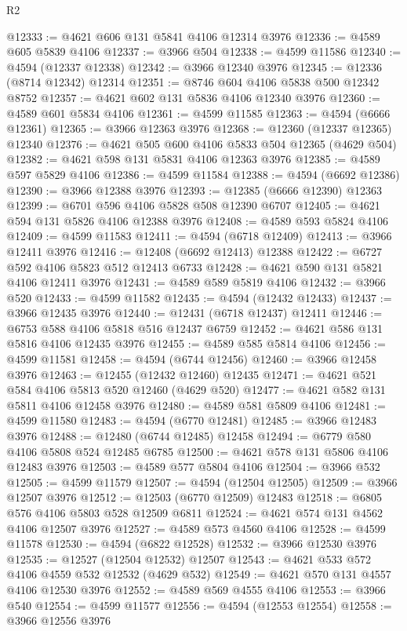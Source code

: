 \begin{lexlean}{R2}
\begin{coremodule}
@12333 := @4621 @606 @131 @5841 @4106 @12314 @3976
@12336 := @4589 @605 @5839 @4106
@12337 := @3966 @504
@12338 := @4599 @11586
@12340 := @4594 (@12337 @12338)
@12342 := @3966 @12340 @3976
@12345 := @12336 (@8714 @12342) @12314
@12351 := @8746 @604 @4106 @5838 @500 @12342 @8752
@12357 := @4621 @602 @131 @5836 @4106 @12340 @3976
@12360 := @4589 @601 @5834 @4106
@12361 := @4599 @11585
@12363 := @4594 (@6666 @12361)
@12365 := @3966 @12363 @3976
@12368 := @12360 (@12337 @12365) @12340
@12376 := @4621 @505 @600 @4106 @5833 @504 @12365 (@4629 @504)
@12382 := @4621 @598 @131 @5831 @4106 @12363 @3976
@12385 := @4589 @597 @5829 @4106
@12386 := @4599 @11584
@12388 := @4594 (@6692 @12386)
@12390 := @3966 @12388 @3976
@12393 := @12385 (@6666 @12390) @12363
@12399 := @6701 @596 @4106 @5828 @508 @12390 @6707
@12405 := @4621 @594 @131 @5826 @4106 @12388 @3976
@12408 := @4589 @593 @5824 @4106
@12409 := @4599 @11583
@12411 := @4594 (@6718 @12409)
@12413 := @3966 @12411 @3976
@12416 := @12408 (@6692 @12413) @12388
@12422 := @6727 @592 @4106 @5823 @512 @12413 @6733
@12428 := @4621 @590 @131 @5821 @4106 @12411 @3976
@12431 := @4589 @589 @5819 @4106
@12432 := @3966 @520
@12433 := @4599 @11582
@12435 := @4594 (@12432 @12433)
@12437 := @3966 @12435 @3976
@12440 := @12431 (@6718 @12437) @12411
@12446 := @6753 @588 @4106 @5818 @516 @12437 @6759
@12452 := @4621 @586 @131 @5816 @4106 @12435 @3976
@12455 := @4589 @585 @5814 @4106
@12456 := @4599 @11581
@12458 := @4594 (@6744 @12456)
@12460 := @3966 @12458 @3976
@12463 := @12455 (@12432 @12460) @12435
@12471 := @4621 @521 @584 @4106 @5813 @520 @12460 (@4629 @520)
@12477 := @4621 @582 @131 @5811 @4106 @12458 @3976
@12480 := @4589 @581 @5809 @4106
@12481 := @4599 @11580
@12483 := @4594 (@6770 @12481)
@12485 := @3966 @12483 @3976
@12488 := @12480 (@6744 @12485) @12458
@12494 := @6779 @580 @4106 @5808 @524 @12485 @6785
@12500 := @4621 @578 @131 @5806 @4106 @12483 @3976
@12503 := @4589 @577 @5804 @4106
@12504 := @3966 @532
@12505 := @4599 @11579
@12507 := @4594 (@12504 @12505)
@12509 := @3966 @12507 @3976
@12512 := @12503 (@6770 @12509) @12483
@12518 := @6805 @576 @4106 @5803 @528 @12509 @6811
@12524 := @4621 @574 @131 @4562 @4106 @12507 @3976
@12527 := @4589 @573 @4560 @4106
@12528 := @4599 @11578
@12530 := @4594 (@6822 @12528)
@12532 := @3966 @12530 @3976
@12535 := @12527 (@12504 @12532) @12507
@12543 := @4621 @533 @572 @4106 @4559 @532 @12532 (@4629 @532)
@12549 := @4621 @570 @131 @4557 @4106 @12530 @3976
@12552 := @4589 @569 @4555 @4106
@12553 := @3966 @540
@12554 := @4599 @11577
@12556 := @4594 (@12553 @12554)
@12558 := @3966 @12556 @3976

\end{coremodule}
\end{lexlean}
